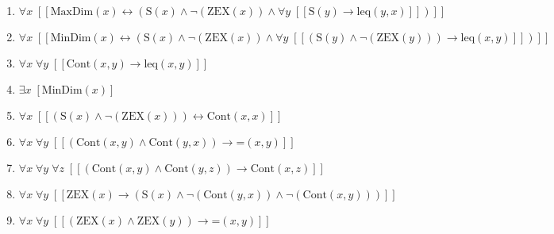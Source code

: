 \documentclass{article}
\begin{document}
\begin{enumerate}
\item $\forall x\;  \left[ \left[ \textrm{MaxDim}(x) \leftrightarrow \left(\textrm{S}(x) \land \neg \left(\textrm{ZEX}(x)\right) \land \forall y\;  \left[ \left[ \textrm{S}(y) \rightarrow \textrm{leq}(y,x) \right] \right]\right) \right] \right]$
\item $\forall x\;  \left[ \left[ \textrm{MinDim}(x) \leftrightarrow \left(\textrm{S}(x) \land \neg \left(\textrm{ZEX}(x)\right) \land \forall y\;  \left[ \left[ \left(\textrm{S}(y) \land \neg \left(\textrm{ZEX}(y)\right)\right) \rightarrow \textrm{leq}(x,y) \right] \right]\right) \right] \right]$
\item $\forall x\; \forall y\;  \left[ \left[ \textrm{Cont}(x,y) \rightarrow \textrm{leq}(x,y) \right] \right]$
\item $\exists x\;  \left[ \textrm{MinDim}(x) \right]$
\item $\forall x\;  \left[ \left[ \left(\textrm{S}(x) \land \neg \left(\textrm{ZEX}(x)\right)\right) \leftrightarrow \textrm{Cont}(x,x) \right] \right]$
\item $\forall x\; \forall y\;  \left[ \left[ \left(\textrm{Cont}(x,y) \land \textrm{Cont}(y,x)\right) \rightarrow \textrm{=}(x,y) \right] \right]$
\item $\forall x\; \forall y\; \forall z\;  \left[ \left[ \left(\textrm{Cont}(x,y) \land \textrm{Cont}(y,z)\right) \rightarrow \textrm{Cont}(x,z) \right] \right]$
\item $\forall x\; \forall y\;  \left[ \left[ \textrm{ZEX}(x) \rightarrow \left(\textrm{S}(x) \land \neg \left(\textrm{Cont}(y,x)\right) \land \neg \left(\textrm{Cont}(x,y)\right)\right) \right] \right]$
\item $\forall x\; \forall y\;  \left[ \left[ \left(\textrm{ZEX}(x) \land \textrm{ZEX}(y)\right) \rightarrow \textrm{=}(x,y) \right] \right]$
\end{enumerate}
\end{document}
